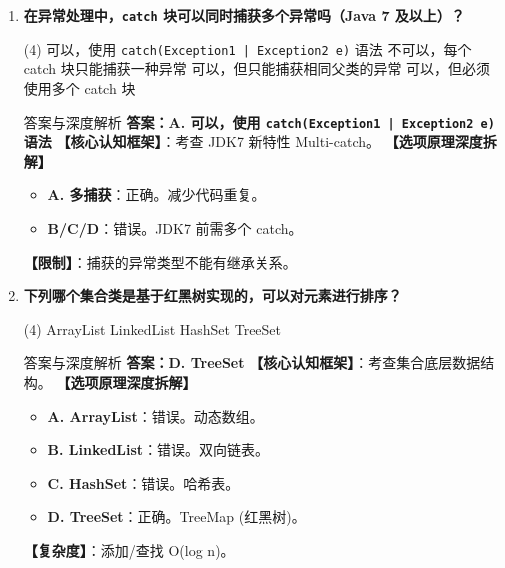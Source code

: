 \documentclass[12pt, a4paper]{ctexart}
\newcommand{\code}[1]{\texttt{#1}}
\begin{document}
\begin{enumerate}[label=\textbf{\arabic*.}, itemsep=1em]
    \item \textbf{在异常处理中，\code{catch} 块可以同时捕获多个异常吗（Java 7 及以上）？}
    \begin{tasks}(4)
        \task 可以，使用 \code{catch(Exception1 | Exception2 e)} 语法 \task 不可以，每个 catch 块只能捕获一种异常
        \task 可以，但只能捕获相同父类的异常 \task 可以，但必须使用多个 catch 块
    \end{tasks}
    \begin{bluebox}{答案与深度解析}
    \textbf{答案：A. 可以，使用 \code{catch(Exception1 | Exception2 e)} 语法}
    \textbf{【核心认知框架】}：考查 JDK7 新特性 Multi-catch。
    \textbf{【选项原理深度拆解】}
    \begin{itemize}[leftmargin=*, nosep]
        \item \textbf{A. 多捕获}：正确。减少代码重复。
        \item \textbf{B/C/D}：错误。JDK7 前需多个 catch。
    \end{itemize}
    \textbf{【限制】}：捕获的异常类型不能有继承关系。
    \end{bluebox}

    \item \textbf{下列哪个集合类是基于红黑树实现的，可以对元素进行排序？}
    \begin{tasks}(4)
        \task ArrayList \task LinkedList \task HashSet \task TreeSet
    \end{tasks}
    \begin{bluebox}{答案与深度解析}
    \textbf{答案：D. TreeSet}
    \textbf{【核心认知框架】}：考查集合底层数据结构。
    \textbf{【选项原理深度拆解】}
    \begin{itemize}[leftmargin=*, nosep]
        \item \textbf{A. ArrayList}：错误。动态数组。
        \item \textbf{B. LinkedList}：错误。双向链表。
        \item \textbf{C. HashSet}：错误。哈希表。
        \item \textbf{D. TreeSet}：正确。TreeMap (红黑树)。
    \end{itemize}
    \textbf{【复杂度】}：添加/查找 O(log n)。
    \end{bluebox}


\end{enumerate}
\end{document}
